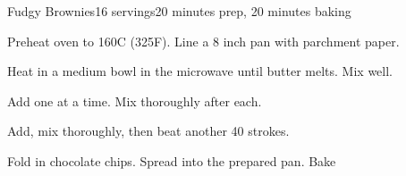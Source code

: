 \documentclass[../Cookbook.tex]{subfiles}
\begin{document}
\begin{recipe}{Fudgy Brownies}{16 servings}{20 minutes prep, 20 minutes baking}

Preheat oven to 160\0C (325\0F). Line a 8 inch pan with parchment paper.

Heat in a medium bowl in the microwave until butter melts. Mix well.

Add one at a time. Mix thoroughly after each.

Add, mix thoroughly, then beat another 40 strokes.

Fold in chocolate chips. Spread into the prepared pan. Bake 

\end{recipe}
\end{document}
